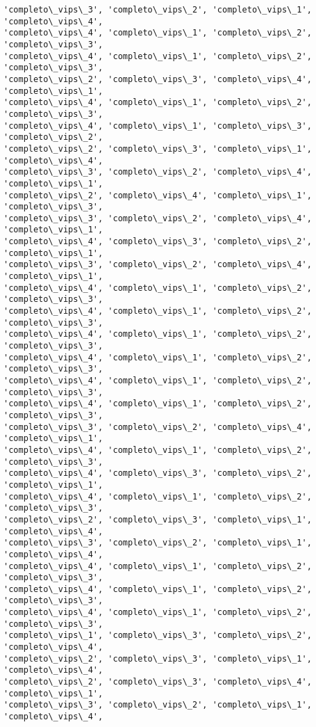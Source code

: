 \documentclass[11pt]{article}
\begin{document}
\begin{Verbatim}[commandchars=\\\{\}]
'completo\_vips\_3', 'completo\_vips\_2', 'completo\_vips\_1', 'completo\_vips\_4',
'completo\_vips\_4', 'completo\_vips\_1', 'completo\_vips\_2', 'completo\_vips\_3',
'completo\_vips\_4', 'completo\_vips\_1', 'completo\_vips\_2', 'completo\_vips\_3',
'completo\_vips\_2', 'completo\_vips\_3', 'completo\_vips\_4', 'completo\_vips\_1',
'completo\_vips\_4', 'completo\_vips\_1', 'completo\_vips\_2', 'completo\_vips\_3',
'completo\_vips\_4', 'completo\_vips\_1', 'completo\_vips\_3', 'completo\_vips\_2',
'completo\_vips\_2', 'completo\_vips\_3', 'completo\_vips\_1', 'completo\_vips\_4',
'completo\_vips\_3', 'completo\_vips\_2', 'completo\_vips\_4', 'completo\_vips\_1',
'completo\_vips\_2', 'completo\_vips\_4', 'completo\_vips\_1', 'completo\_vips\_3',
'completo\_vips\_3', 'completo\_vips\_2', 'completo\_vips\_4', 'completo\_vips\_1',
'completo\_vips\_4', 'completo\_vips\_3', 'completo\_vips\_2', 'completo\_vips\_1',
'completo\_vips\_3', 'completo\_vips\_2', 'completo\_vips\_4', 'completo\_vips\_1',
'completo\_vips\_4', 'completo\_vips\_1', 'completo\_vips\_2', 'completo\_vips\_3',
'completo\_vips\_4', 'completo\_vips\_1', 'completo\_vips\_2', 'completo\_vips\_3',
'completo\_vips\_4', 'completo\_vips\_1', 'completo\_vips\_2', 'completo\_vips\_3',
'completo\_vips\_4', 'completo\_vips\_1', 'completo\_vips\_2', 'completo\_vips\_3',
'completo\_vips\_4', 'completo\_vips\_1', 'completo\_vips\_2', 'completo\_vips\_3',
'completo\_vips\_4', 'completo\_vips\_1', 'completo\_vips\_2', 'completo\_vips\_3',
'completo\_vips\_3', 'completo\_vips\_2', 'completo\_vips\_4', 'completo\_vips\_1',
'completo\_vips\_4', 'completo\_vips\_1', 'completo\_vips\_2', 'completo\_vips\_3',
'completo\_vips\_4', 'completo\_vips\_3', 'completo\_vips\_2', 'completo\_vips\_1',
'completo\_vips\_4', 'completo\_vips\_1', 'completo\_vips\_2', 'completo\_vips\_3',
'completo\_vips\_2', 'completo\_vips\_3', 'completo\_vips\_1', 'completo\_vips\_4',
'completo\_vips\_3', 'completo\_vips\_2', 'completo\_vips\_1', 'completo\_vips\_4',
'completo\_vips\_4', 'completo\_vips\_1', 'completo\_vips\_2', 'completo\_vips\_3',
'completo\_vips\_4', 'completo\_vips\_1', 'completo\_vips\_2', 'completo\_vips\_3',
'completo\_vips\_4', 'completo\_vips\_1', 'completo\_vips\_2', 'completo\_vips\_3',
'completo\_vips\_1', 'completo\_vips\_3', 'completo\_vips\_2', 'completo\_vips\_4',
'completo\_vips\_2', 'completo\_vips\_3', 'completo\_vips\_1', 'completo\_vips\_4',
'completo\_vips\_2', 'completo\_vips\_3', 'completo\_vips\_4', 'completo\_vips\_1',
'completo\_vips\_3', 'completo\_vips\_2', 'completo\_vips\_1', 'completo\_vips\_4',

\end{Verbatim}
\end{document}

